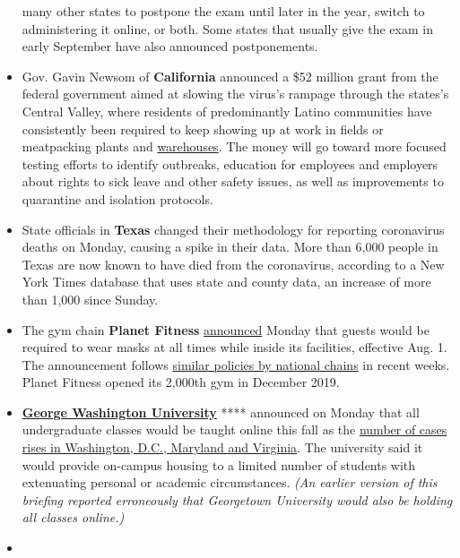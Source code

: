 \begin{itemize}
  many other states to postpone the exam until later in the year, switch
  to administering it online, or both. Some states that usually give the
  exam in early September have also announced postponements.
\item
  Gov. Gavin Newsom of \textbf{California} announced a \$52 million
  grant from the federal government aimed at slowing the virus's rampage
  through the states's Central Valley, where residents of predominantly
  Latino communities have consistently been required to keep showing up
  at work in fields or meatpacking plants and
  \href{https://www.nytimes.com/2020/07/22/us/coronavirus-ca-warehouse-workers.html}{warehouses}.
  The money will go toward more focused testing efforts to identify
  outbreaks, education for employees and employers about rights to sick
  leave and other safety issues, as well as improvements to quarantine
  and isolation protocols.
\item
  State officials in \textbf{Texas} changed their methodology for
  reporting coronavirus deaths on Monday, causing a spike in their data.
  More than 6,000 people in Texas are now known to have died from the
  coronavirus, according to a New York Times database that uses state
  and county data, an increase of more than 1,000 since Sunday.
\item
  The gym chain \textbf{Planet Fitness}
  \href{https://www.planetfitness.com/club-cleanliness}{announced}
  Monday that guests would be required to wear masks at all times while
  inside its facilities, effective Aug. 1. The announcement follows
  \href{https://www.nytimes.com/article/which-stores-require-masks.html}{similar
  policies by national chains} in recent weeks. Planet Fitness opened
  its 2,000th gym in December 2019.
\item
  \textbf{\href{https://coronavirus.gwu.edu/}{George Washington
  University}} **** announced on Monday that all undergraduate classes
  would be taught online this fall as the
  \href{https://www.nytimes.com/interactive/2020/us/coronavirus-us-cases.html?action=click\&pgtype=Article\&state=default\&module=styln-coronavirus\&region=TOP_BANNER\&context=storylines_menu}{number
  of cases rises in Washington, D.C., Maryland and Virginia}. The
  university said it would provide on-campus housing to a limited number
  of students with extenuating personal or academic circumstances.
  \emph{(An earlier version of this briefing reported erroneously that
  Georgetown University would also be holding all classes online.)}
\item

\end{itemize}
